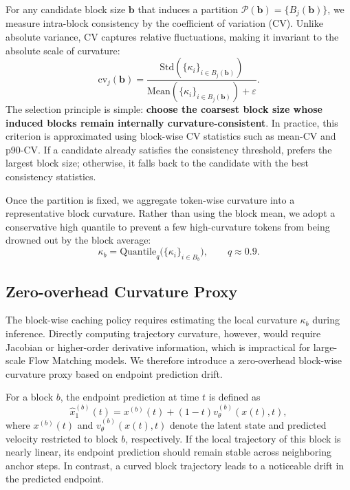 For any candidate block size $\mathbf{b}$ that induces a partition $\mathcal{P}(\mathbf{b})=\{B_j(\mathbf{b})\}$, we measure intra-block consistency by the coefficient of variation (CV). Unlike absolute variance, CV captures relative fluctuations, making it invariant to the absolute scale of curvature:
\begin{equation}
    \mathrm{cv}_j(\mathbf{b}) =
    \frac{\mathrm{Std}(\{\kappa_i\}_{i \in B_j(\mathbf{b})})}
    {\mathrm{Mean}(\{\kappa_i\}_{i \in B_j(\mathbf{b})}) + \varepsilon}.
\end{equation}
The selection principle is simple: \textbf{choose the coarsest block size whose induced blocks remain internally curvature-consistent}. In practice, this criterion is approximated using block-wise CV statistics such as mean-CV and p90-CV. If a candidate already satisfies the consistency threshold, \cubic prefers the largest block size; otherwise, it falls back to the candidate with the best consistency statistics.

Once the partition is fixed, we aggregate token-wise curvature into a representative block curvature. Rather than using the block mean, we adopt a conservative high quantile to prevent a few high-curvature tokens from being drowned out by the block average:
\begin{equation}
    \kappa_b = \mathrm{Quantile}_{q}\big(\{\kappa_i\}_{i \in B_b}\big), \qquad q \approx 0.9.
\end{equation}

\subsection{Zero-overhead Curvature Proxy}
\label{sec:curvature_proxy}

The block-wise caching policy requires estimating the local curvature
$\kappa_b$ during inference. Directly computing trajectory curvature,
however, would require Jacobian or higher-order derivative information,
which is impractical for large-scale Flow Matching models. We therefore
introduce a zero-overhead block-wise curvature proxy based on endpoint
prediction drift.

For a block $b$, the endpoint prediction at time $t$ is defined as
\begin{equation}
    \hat{x}_{1}^{(b)}(t)
    =
    x^{(b)}(t)
    +
    (1 - t)
    v_{\theta}^{(b)}(x(t), t),
    \label{eq:block_endpoint_prediction}
\end{equation}
where $x^{(b)}(t)$ and $v_{\theta}^{(b)}(x(t),t)$ denote the latent state
and predicted velocity restricted to block $b$, respectively. If the
local trajectory of this block is nearly linear, its endpoint prediction
should remain stable across neighboring anchor steps. In contrast, a
curved block trajectory leads to a noticeable drift in the predicted
endpoint.

